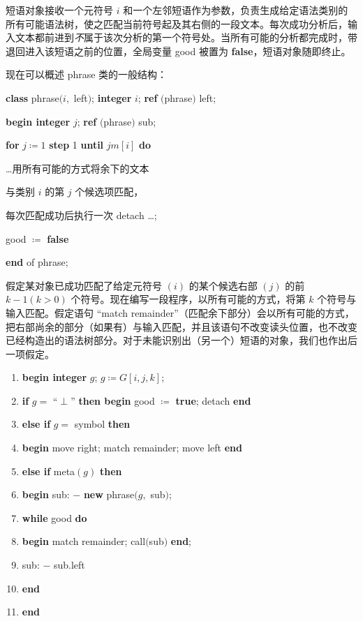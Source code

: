 \documentclass[twoside,11pt,fontset=none]{ctexbook}
\begin{document}
短语对象接收一个元符号 $i$ 和一个左邻短语作为参数，负责生成给定语法类别的所有可能语法树，使之匹配当前符号起及其右侧的一段文本。每次成功分析后，输入文本都前进到\textit{不}属于该次分析的第一个符号处。当所有可能的分析都完成时，带退回进入该短语之前的位置，全局变量 good 被置为 \textbf{false}，短语对象随即终止。

现在可以概述 phrase 类的一般结构：

\quad \textbf{class} phrase$(i,$ left$)$; \textbf{integer} $i$; \textbf{ref} $($phrase$)$ left;

\quad \quad \textbf{begin integer} $j$; \textbf{ref} $($phrase$)$ sub;

\quad \quad \quad \textbf{for} $j\coloneq 1$ \textbf{step} 1 \textbf{until} $jm[i]$ \textbf{do}

\quad \quad \quad \quad \dots 用所有可能的方式将余下的文本

\quad \quad \quad \quad 与类别 $i$ 的第 $j$ 个候选项匹配，

\quad \quad \quad \quad 每次匹配成功后执行一次 detach \dots;

\quad \quad \quad good $\coloneq$ \textbf{false}

\quad \textbf{end} of phrase;

假定某对象已成功匹配了给定元符号 $(i)$ 的某个候选右部 $(j)$ 的前 $k - 1(k > 0)$ 个符号。现在编写一段程序，以所有可能的方式，将第 $k$ 个符号与输入匹配。假定语句 ``match remainder''（匹配余下部分）会以所有可能的方式，把右部尚余的部分（如果有）与输入匹配，并且该语句不改变读头位置，也不改变已经构造出的语法树部分。对于未能识别出（另一个）短语的对象，我们也作出后一项假定。

\begin{enumerate}[nosep, label=\arabic*.]
	\item \textbf{begin integer} $g$; $g\coloneq G[i, j, k]$;
	\item \label{en:comment-label-2}
	\quad \textbf{if} $g =$ ``$\perp$'' \textbf{then begin} good $\coloneq$ \textbf{true}; detach \textbf{end}
	
	\item \quad \textbf{else if} $g =$ symbol \textbf{then}
	
	\item \label{en:comment-label-4}
	\quad \textbf{begin} move right; match remainder; move left \textbf{end}
	
	\item \quad \textbf{else if} meta$(g)$ \textbf{then}
	
	\item \label{en:comment-label-6}
	\quad \textbf{begin} sub: $-$ \textbf{new} phrase$(g,$ sub$)$;
	\item \quad \quad \textbf{while} good \textbf{do}
	
	\item \label{en:comment-label-8}
	\quad \quad \textbf{begin} match remainder; call$($sub$)$ \textbf{end};
	
	\item \label{en:comment-label-9}
	\quad \quad sub: $-$ sub.left
	
	\item \quad \quad \textbf{end}
	\item \quad \textbf{end}
\end{enumerate}
\end{document}
